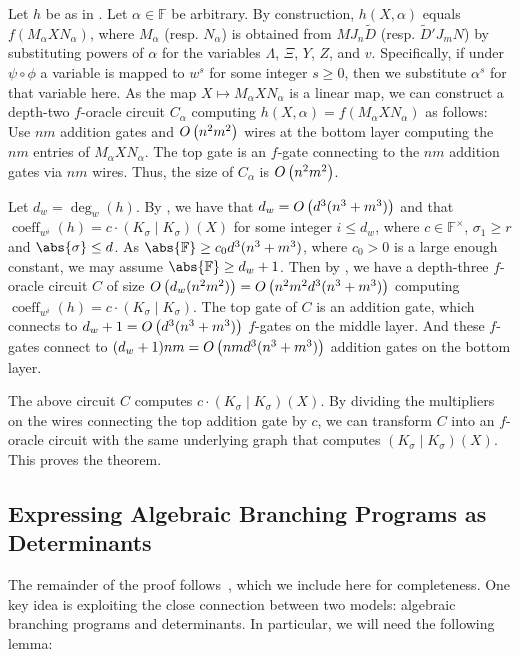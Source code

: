 \documentclass[10pt,a4paper]{amsart}
\DeclareMathOperator{\coeff}{coeff}
\newcommand*\F{\mathbb{F}}
\newcommand*\bigO[1]{%
    O\kern-0.0pt\left(#1\right)
}
\begin{document}
\begin{pf}
    Let $h$ be as in .
    Let $\alpha\in\F$ be arbitrary.
    By construction, $h(X,\alpha)$ equals $f(M_\alpha X N_\alpha)$, where $M_\alpha$ (resp. $N_\alpha$) is obtained from $M J_n \widetilde{D}$ (resp. $\widetilde{D}' J_m N$) by substituting powers of $\alpha$ for the variables $\Lambda$, $\Xi$, $Y$, $Z$, and $v$.
    Specifically, if under $\psi \circ \phi$ a variable is mapped to $w^s$ for some integer $s \geq 0$, then we substitute $\alpha^s$ for that variable here.
    As the map $X\mapsto M_\alpha X N_\alpha$ is a linear map, we can construct a depth-two $f$-oracle circuit $C_\alpha$ computing $h(X,\alpha)=f(M_\alpha X N_\alpha)$ as follows:
    Use $nm$ addition gates and $\bigO{n^2m^2}$ wires at the bottom layer computing the $nm$ entries of $M_\alpha X N_\alpha$.
    The top gate is an $f$-gate connecting to the $nm$ addition gates via $nm$ wires.
    Thus, the size of $C_\alpha$ is $\bigO{n^2m^2}$.
    
    Let $d_w=\deg_w(h)$.
    By , we have that $d_w = \bigO{d^3(n^3+m^3)}$ and that $\coeff_{w^i}(h) = c\cdot {(K_\sigma\mid K_\sigma)}(X)$ for some integer $i\leq d_w$, where $c\in\F^\times$, $\sigma_1\geq r$ and $\abs{\sigma} \leq d$.
    As $\abs{\F} \geq c_0 d^3(n^3+m^3)$, where $c_0>0$ is a large enough constant, we may assume $\abs{\F} \geq d_w+1$.
    Then by , we have a depth-three $f$-oracle circuit $C$ of size $\bigO{d_w(n^2m^2)} = \bigO{n^2m^2d^3(n^3+m^3)}$ computing $\coeff_{w^i}(h)=c\cdot (K_\sigma\mid K_\sigma)$. 
    The top gate of $C$ is an addition gate, which connects to $d_w+1 = \bigO{d^3(n^3+m^3)}$ $f$-gates on the middle layer.
    And these $f$-gates connect to $(d_w+1)nm = \bigO{nmd^3(n^3+m^3)}$ addition gates on the bottom layer.
    
    The above circuit $C$ computes $c \cdot (K_\sigma\mid K_\sigma)(X)$.
    By dividing the multipliers on the wires connecting the top addition gate by $c$, we can transform $C$ into an $f$-oracle circuit with the same underlying graph that computes $(K_\sigma\mid K_\sigma)(X)$.
    This proves the theorem.
\end{pf}

\subsection{Expressing Algebraic Branching Programs as Determinants}

The remainder of the proof follows~\cite{AF21}, which we include here for completeness.
One key idea is exploiting the close connection between two models: algebraic branching programs and determinants.
In particular, we will need the following lemma:
\end{document}
